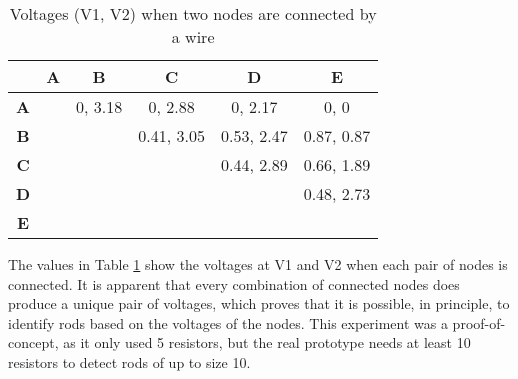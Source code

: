 \begin{table}[H]
\centering
\begin{tabular}{c|ccccc}
\cline{2-6}
                                 & \multicolumn{1}{c|}{\textbf{A}}                 & \multicolumn{1}{c|}{\textbf{B}}                 & \multicolumn{1}{c|}{\textbf{C}}                 & \multicolumn{1}{c|}{\textbf{D}}                 & \multicolumn{1}{c|}{\textbf{E}}                 \\ \hline
\multicolumn{1}{|c|}{\textbf{A}} & \multicolumn{1}{c|}{\cellcolor[HTML]{C0C0C0}}   & \multicolumn{1}{c|}{0, 3.18}                    & \multicolumn{1}{c|}{0, 2.88}                    & \multicolumn{1}{c|}{0, 2.17}                    & \multicolumn{1}{c|}{0, 0}                       \\ \cline{1-1} \cline{3-6} 
\multicolumn{1}{|c|}{\textbf{B}} & \cellcolor[HTML]{C0C0C0}                        & \multicolumn{1}{c|}{\cellcolor[HTML]{C0C0C0}}   & \multicolumn{1}{c|}{0.41, 3.05}                 & \multicolumn{1}{c|}{0.53, 2.47}                 & \multicolumn{1}{c|}{0.87, 0.87}                 \\ \cline{1-1} \cline{4-6} 
\multicolumn{1}{|c|}{\textbf{C}} & \cellcolor[HTML]{C0C0C0}                        & \cellcolor[HTML]{C0C0C0}                        & \multicolumn{1}{c|}{\cellcolor[HTML]{C0C0C0}}   & \multicolumn{1}{c|}{0.44, 2.89}                 & \multicolumn{1}{c|}{0.66, 1.89}                 \\ \cline{1-1} \cline{5-6} 
\multicolumn{1}{|c|}{\textbf{D}} & \cellcolor[HTML]{C0C0C0}                        & \cellcolor[HTML]{C0C0C0}                        & \cellcolor[HTML]{C0C0C0}                        & \multicolumn{1}{c|}{\cellcolor[HTML]{C0C0C0}}   & \multicolumn{1}{c|}{0.48, 2.73}                 \\ \cline{1-1} \cline{6-6} 
\multicolumn{1}{|c|}{\textbf{E}} & \cellcolor[HTML]{C0C0C0}{\color[HTML]{333333} } & \cellcolor[HTML]{C0C0C0}{\color[HTML]{333333} } & \cellcolor[HTML]{C0C0C0}{\color[HTML]{333333} } & \cellcolor[HTML]{C0C0C0}{\color[HTML]{333333} } & \cellcolor[HTML]{C0C0C0}{\color[HTML]{333333} } \\ \cline{1-1}
\end{tabular}
\caption{Voltages (V1, V2) when two nodes are connected by a wire}
\label{tab:5r_voltages}
\end{table}

The values in Table \ref{tab:5r_voltages} show the voltages at V1 and V2 when each pair of nodes is connected. It is apparent that every combination of connected nodes does produce a unique pair of voltages, which proves that it is possible, in principle, to identify rods based on the voltages of the nodes. This experiment was a proof-of-concept, as it only used 5 resistors, but the real prototype needs at least 10 resistors to detect rods of up to size 10.\\

